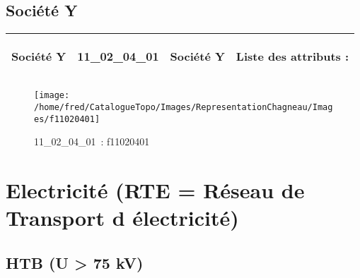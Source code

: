 \documentclass[12pt,titlepage]{book}
\begin{document}
\subsection{Société Y}
\noindent
\vspace{\baselineskip}

\renewcommand{\arraystretch}{1.2}
\begin{supertabular}{|p{10cm}|c|p{13cm}|p{12cm}|}
 Société Y & 11\_02\_04\_01 & Société Y & Liste des attributs :
\begin{enumerate}
\end{enumerate}
\\
\hline
\end{supertabular}
\begin{figure}[h!]
  \hfill         %
  \begin{minipage}[t]{3cm}
    \begin{center}
      \texttt{[image: /home/fred/CatalogueTopo/Images/RepresentationChagneau/Images/f11020401]}
      \caption[~11\_02\_04\_01]{\small{11\_02\_04\_01~:} \tiny{f11020401}}\label{f11020401}
    \end{center}
  \end{minipage}
\end{figure}

\section{\large Electricité (RTE = Réseau de Transport d électricité)}
\subsection{HTB (U > 75 kV)}
\noindent
\vspace{\baselineskip}
\end{document}
